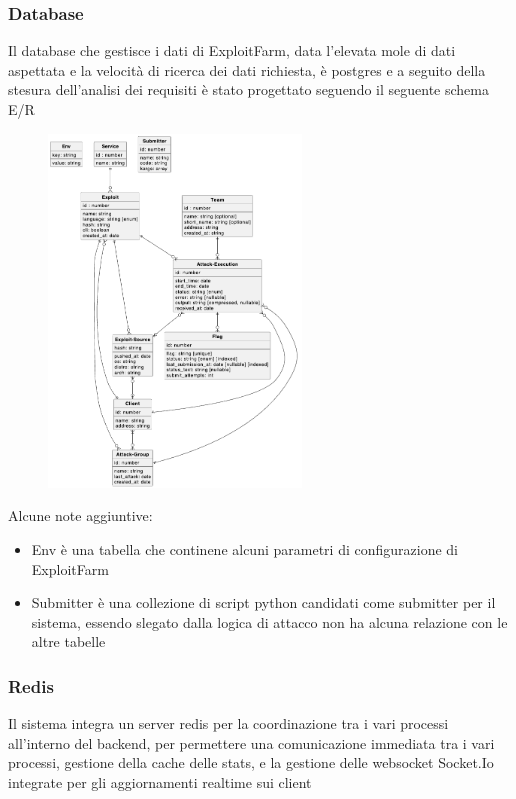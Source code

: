 \documentclass[11pt]{article}
\begin{document}
\subsubsection{Database}
Il database che gestisce i dati di ExploitFarm, data l'elevata mole di dati aspettata e la velocità di ricerca dei dati richiesta, è postgres e a seguito della stesura dell'analisi dei requisiti è stato progettato seguendo il seguente schema E/R
    \begin{figure}[H]
    	\centering
    	\includegraphics[width=0.6\textwidth]{ExploitFarmDB.png}
	\end{figure}
	Alcune note aggiuntive:
	\begin{itemize}
		\item Env è una tabella che continene alcuni parametri di configurazione di ExploitFarm
		\item Submitter è una collezione di script python candidati come submitter per il sistema, essendo slegato dalla logica di attacco non ha alcuna relazione con le altre tabelle
	\end{itemize}
\subsubsection{Redis}
Il sistema integra un server redis per la coordinazione tra i vari processi all'interno del backend, per permettere una comunicazione immediata tra i vari processi, gestione della cache delle stats, e la gestione delle websocket Socket.Io integrate per gli aggiornamenti realtime sui client
\end{document}
